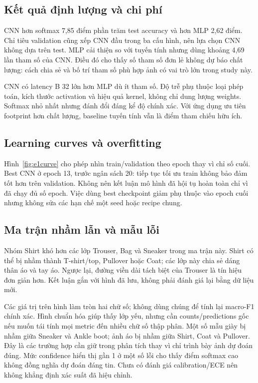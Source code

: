 \documentclass[11pt,a4paper]{article}
\begin{document}
\subsection{Kết quả định lượng và chi phí}


CNN hơn softmax 7,85 điểm phần trăm test accuracy và hơn MLP 2,62 điểm. Chỉ tiêu validation cũng xếp CNN đầu trong ba cấu hình, nên lựa chọn CNN không dựa trên test. MLP cải thiện so với tuyến tính nhưng dùng khoảng 4,69 lần tham số của CNN. Điều đó cho thấy số tham số đơn lẻ không dự báo chất lượng: cách chia sẻ và bố trí tham số phù hợp ảnh có vai trò lớn trong study này.

CNN có latency B 32 lớn hơn MLP dù ít tham số. Độ trễ phụ thuộc loại phép toán, kích thước activation và hiệu quả kernel, không chỉ dung lượng weights. Softmax nhỏ nhất nhưng đánh đổi đáng kể độ chính xác. Với ứng dụng ưu tiên footprint hơn chất lượng, baseline tuyến tính vẫn là điểm tham chiếu hữu ích.

\subsection{Learning curves và overfitting}
Hình~\ref{fig:e1curve} cho phép nhìn train/validation theo epoch thay vì chỉ số cuối. Best CNN ở epoch 13, trước ngân sách 20: tiếp tục tối ưu train không bảo đảm tốt hơn trên validation. Không nên kết luận mô hình đã hội tụ hoàn toàn chỉ vì đã chạy đủ số epoch. Việc dùng best checkpoint giảm phụ thuộc vào epoch cuối nhưng không sửa các hạn chế một seed hoặc recipe chung.
\clearpage

\subsection{Ma trận nhầm lẫn và mẫu lỗi}
Nhóm Shirt khó hơn các lớp Trouser, Bag và Sneaker trong ma trận này. Shirt có thể bị nhầm thành T-shirt/top, Pullover hoặc Coat; các lớp này chia sẻ dáng thân áo và tay áo. Ngược lại, đường viền dài tách biệt của Trouser là tín hiệu đơn giản hơn. Kết luận gắn với hình đã lưu, không phải đánh giá lại bằng dữ liệu mới.

Các giá trị trên hình làm tròn hai chữ số; không dùng chúng để tính lại macro-F1 chính xác. Hình chuẩn hóa giúp thấy lớp yếu, nhưng cần counts/predictions gốc nếu muốn tái tính mọi metric đến nhiều chữ số thập phân.
\clearpage
{}
Một số mẫu giày bị nhầm giữa Sneaker và Ankle boot; ảnh áo bị nhầm giữa Shirt, Coat và Pullover. Đây là các trường hợp cần giữ trong phân tích thay vì chỉ trình bày ảnh dự đoán đúng. Mức confidence hiển thị gần 1 ở một số lỗi cho thấy điểm softmax cao không đồng nghĩa dự đoán đáng tin. Chưa có đánh giá calibration/ECE nên không khẳng định xác suất đã hiệu chỉnh.
\end{document}
